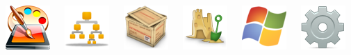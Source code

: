 \documentclass[green]{beamer}
\begin{document}
\begin{frame}
\begin{columns}[c]
	\begin{center}
	    \includegraphics[scale=0.28]{img/pintura.png}
	\end{center}
	
	\begin{center}
	    \includegraphics[scale=0.28]{img/arbol.png}
	\end{center}
	
	\begin{center}
	    \includegraphics[scale=0.28]{img/materiales.png}
	\end{center}
	
	\column{40pt}
	
	\begin{center}
	    \includegraphics[scale=0.28]{img/castillo.png}
	\end{center}
	
	\begin{center}
	    \includegraphics[scale=0.28]{img/windows.png}
	\end{center}
	
	\begin{center}
	    \includegraphics[scale=0.28]{img/engranaje.png}
	\end{center}
	

\end{columns}
\end{frame}
\end{document}
